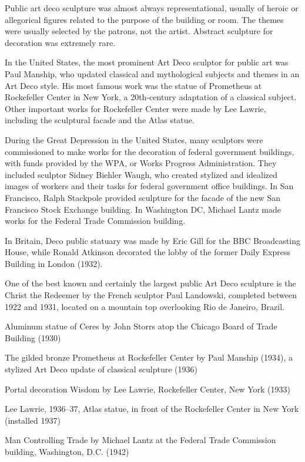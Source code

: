 Public art deco sculpture was almost always representational, usually of
heroic or allegorical figures related to the purpose of the building or
room. The themes were usually selected by the patrons, not the artist.
Abstract sculpture for decoration was extremely rare.

In the United States, the most prominent Art Deco sculptor for public
art was Paul Manship, who updated classical and mythological subjects
and themes in an Art Deco style. His most famous work was the statue of
Prometheus at Rockefeller Center in New York, a 20th-century adaptation
of a classical subject. Other important works for Rockefeller Center
were made by Lee Lawrie, including the sculptural facade and the Atlas
statue.

During the Great Depression in the United States, many sculptors were
commissioned to make works for the decoration of federal government
buildings, with funds provided by the WPA, or Works Progress
Administration. They included sculptor Sidney Biehler Waugh, who created
stylized and idealized images of workers and their tasks for federal
government office buildings. In San Francisco, Ralph Stackpole provided
sculpture for the facade of the new San Francisco Stock Exchange
building. In Washington DC, Michael Lantz made works for the Federal
Trade Commission building.

In Britain, Deco public statuary was made by Eric Gill for the BBC
Broadcasting House, while Ronald Atkinson decorated the lobby of the
former Daily Express Building in London (1932).

One of the best known and certainly the largest public Art Deco
sculpture is the Christ the Redeemer by the French sculptor Paul
Landowski, completed between 1922 and 1931, located on a mountain top
overlooking Rio de Janeiro, Brazil.

Aluminum statue of Ceres by John Storrs atop the Chicago Board of Trade
Building (1930)

The gilded bronze Prometheus at Rockefeller Center by Paul Manship
(1934), a stylized Art Deco update of classical sculpture (1936)

Portal decoration Wisdom by Lee Lawrie, Rockefeller Center, New York
(1933)

Lee Lawrie, 1936--37, Atlas statue, in front of the Rockefeller Center
in New York (installed 1937)

Man Controlling Trade by Michael Lantz at the Federal Trade Commission
building, Washington, D.C. (1942)

